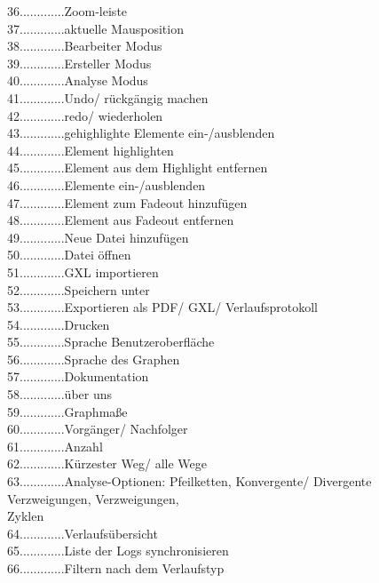 \documentclass[enabledeprecatedfontcommands,fontsize=11pt,paper=a4,twoside]{scrartcl}
\newcounter{one}
\newcommand*{\hdo}{.............}
\begin{document}
36\hdo Zoom-leiste \\
37\hdo aktuelle Mausposition \\
38\hdo Bearbeiter Modus\\
39\hdo Ersteller Modus\\
40\hdo Analyse Modus\\
41\hdo Undo/ rückgängig machen\\
42\hdo redo/ wiederholen\\
43\hdo gehighlighte Elemente ein-/ausblenden\\
44\hdo Element highlighten\\
45\hdo Element aus dem Highlight entfernen\\
46\hdo Elemente ein-/ausblenden\\
47\hdo Element zum Fadeout hinzufügen\\
48\hdo Element aus Fadeout entfernen\\
49\hdo Neue Datei hinzufügen\\
50\hdo Datei öffnen\\
51\hdo GXL importieren\\
52\hdo Speichern unter\\
53\hdo Exportieren als PDF/ GXL/ Verlaufsprotokoll\\
54\hdo Drucken\\
55\hdo Sprache Benutzeroberfläche\\
56\hdo Sprache des Graphen\\
57\hdo Dokumentation\\
58\hdo über uns \\
59\hdo Graphmaße\\
60\hdo Vorgänger/ Nachfolger\\
61\hdo Anzahl\\
62\hdo Kürzester Weg/ alle Wege\\
63\hdo Analyse-Optionen: Pfeilketten, Konvergente/ Divergente Verzweigungen, Verzweigungen,\\ 		
\hspace*{1.7cm} Zyklen\\
64\hdo Verlaufsübersicht\\
65\hdo Liste der Logs synchronisieren\\
66\hdo Filtern nach dem Verlaufstyp\\
\end{document}
